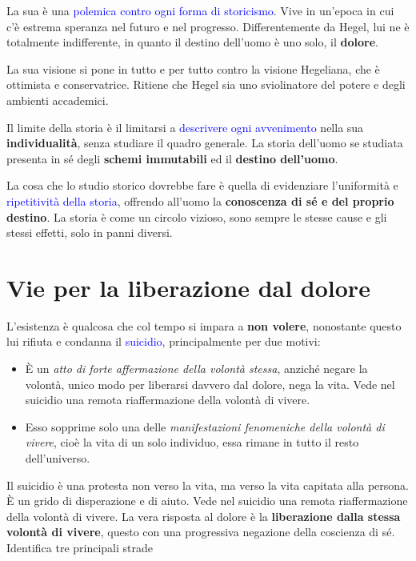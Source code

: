 \documentclass[a4paper, twoside, titlepage]{book}
\renewcommand{\emph}[1]{\textcolor{blue}{#1}}
\begin{document}
La sua è una \emph{polemica contro ogni forma di storicismo}. Vive in un’epoca in cui c’è estrema speranza nel futuro e nel progresso. Differentemente da Hegel, lui ne è totalmente indifferente, in quanto il destino dell’uomo è uno solo, il \textbf{dolore}.

La sua visione si pone in tutto e per tutto contro la visione Hegeliana, che è ottimista e conservatrice.
Ritiene che Hegel sia uno sviolinatore del potere e degli ambienti accademici.

Il limite della storia è il limitarsi a \emph{descrivere ogni avvenimento} nella sua \textbf{individualità}, senza studiare il quadro generale. La storia dell’uomo se studiata presenta in sé degli \textbf{schemi immutabili} ed il \textbf{destino dell’uomo}.

La cosa che lo studio storico dovrebbe fare è quella di evidenziare l’uniformità e \emph{ripetitività della storia}, offrendo all’uomo la \textbf{conoscenza di sé e del proprio destino}. La storia è come un circolo vizioso, sono sempre le stesse cause e gli stessi effetti, solo in panni diversi.

\chapter{Vie per la liberazione dal dolore}

L’esistenza è qualcosa che col tempo si impara a \textbf{non volere}, nonostante questo lui rifiuta e condanna il \emph{suicidio}, principalmente per due motivi:
\begin{itemize}
\item È un \textit{atto di forte affermazione della volontà stessa}, anziché negare la volontà, unico modo per liberarsi davvero dal dolore, nega la vita. Vede nel suicidio una remota riaffermazione della volontà di vivere.
 \item Esso sopprime solo una delle \textit{manifestazioni fenomeniche della volontà di vivere}, cioè la vita di un solo individuo, essa rimane in tutto il resto dell’universo.
\end{itemize}

Il suicidio è una protesta non verso la vita, ma verso la vita capitata alla persona. È un grido di disperazione e di aiuto. Vede nel suicidio una remota riaffermazione della volontà di vivere.
La vera risposta al dolore è la \textbf{liberazione dalla stessa volontà di vivere}, questo con una progressiva negazione della coscienza di sé. Identifica tre principali strade
\end{document}
